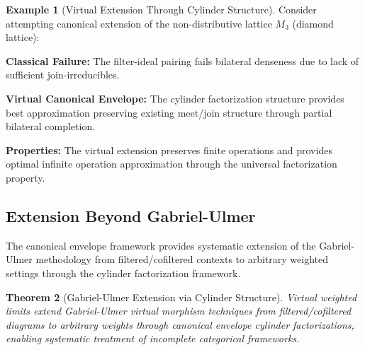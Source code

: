 \documentclass[11pt]{article}
\theoremstyle{plain}
\newtheorem{theorem}{Theorem}[section]
\theoremstyle{definition}
\newtheorem{example}[theorem]{Example}
\theoremstyle{remark}
\begin{document}
\begin{example}[Virtual Extension Through Cylinder Structure]
Consider attempting canonical extension of the non-distributive lattice $M_3$ (diamond lattice):

\textbf{Classical Failure:} The filter-ideal pairing fails bilateral denseness due to lack of sufficient join-irreducibles.

\textbf{Virtual Canonical Envelope:} The cylinder factorization structure provides best approximation preserving existing meet/join structure through partial bilateral completion.

\textbf{Properties:} The virtual extension preserves finite operations and provides optimal infinite operation approximation through the universal factorization property.
\end{example}

\subsection{Extension Beyond Gabriel-Ulmer}

The canonical envelope framework provides systematic extension of the Gabriel-Ulmer methodology \cite{gabriel1971lokal} from filtered/cofiltered contexts to arbitrary weighted settings through the cylinder factorization framework.

\begin{theorem}[Gabriel-Ulmer Extension via Cylinder Structure]
Virtual weighted limits extend Gabriel-Ulmer virtual morphism techniques from filtered/cofiltered diagrams to arbitrary weights through canonical envelope cylinder factorizations, enabling systematic treatment of incomplete categorical frameworks.
\end{theorem}
\end{document}
